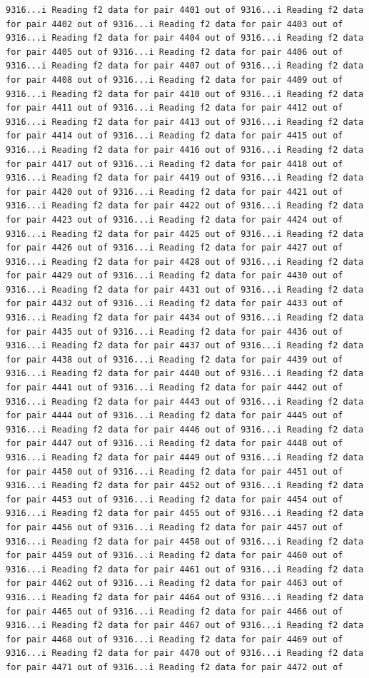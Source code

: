 \documentclass[
]{article}
\begin{document}
\begin{verbatim}
9316...i Reading f2 data for pair 4401 out of 9316...i Reading f2 data for pair 4402 out of 9316...i Reading f2 data for pair 4403 out of 9316...i Reading f2 data for pair 4404 out of 9316...i Reading f2 data for pair 4405 out of 9316...i Reading f2 data for pair 4406 out of 9316...i Reading f2 data for pair 4407 out of 9316...i Reading f2 data for pair 4408 out of 9316...i Reading f2 data for pair 4409 out of 9316...i Reading f2 data for pair 4410 out of 9316...i Reading f2 data for pair 4411 out of 9316...i Reading f2 data for pair 4412 out of 9316...i Reading f2 data for pair 4413 out of 9316...i Reading f2 data for pair 4414 out of 9316...i Reading f2 data for pair 4415 out of 9316...i Reading f2 data for pair 4416 out of 9316...i Reading f2 data for pair 4417 out of 9316...i Reading f2 data for pair 4418 out of 9316...i Reading f2 data for pair 4419 out of 9316...i Reading f2 data for pair 4420 out of 9316...i Reading f2 data for pair 4421 out of 9316...i Reading f2 data for pair 4422 out of 9316...i Reading f2 data for pair 4423 out of 9316...i Reading f2 data for pair 4424 out of 9316...i Reading f2 data for pair 4425 out of 9316...i Reading f2 data for pair 4426 out of 9316...i Reading f2 data for pair 4427 out of 9316...i Reading f2 data for pair 4428 out of 9316...i Reading f2 data for pair 4429 out of 9316...i Reading f2 data for pair 4430 out of 9316...i Reading f2 data for pair 4431 out of 9316...i Reading f2 data for pair 4432 out of 9316...i Reading f2 data for pair 4433 out of 9316...i Reading f2 data for pair 4434 out of 9316...i Reading f2 data for pair 4435 out of 9316...i Reading f2 data for pair 4436 out of 9316...i Reading f2 data for pair 4437 out of 9316...i Reading f2 data for pair 4438 out of 9316...i Reading f2 data for pair 4439 out of 9316...i Reading f2 data for pair 4440 out of 9316...i Reading f2 data for pair 4441 out of 9316...i Reading f2 data for pair 4442 out of 9316...i Reading f2 data for pair 4443 out of 9316...i Reading f2 data for pair 4444 out of 9316...i Reading f2 data for pair 4445 out of 9316...i Reading f2 data for pair 4446 out of 9316...i Reading f2 data for pair 4447 out of 9316...i Reading f2 data for pair 4448 out of 9316...i Reading f2 data for pair 4449 out of 9316...i Reading f2 data for pair 4450 out of 9316...i Reading f2 data for pair 4451 out of 9316...i Reading f2 data for pair 4452 out of 9316...i Reading f2 data for pair 4453 out of 9316...i Reading f2 data for pair 4454 out of 9316...i Reading f2 data for pair 4455 out of 9316...i Reading f2 data for pair 4456 out of 9316...i Reading f2 data for pair 4457 out of 9316...i Reading f2 data for pair 4458 out of 9316...i Reading f2 data for pair 4459 out of 9316...i Reading f2 data for pair 4460 out of 9316...i Reading f2 data for pair 4461 out of 9316...i Reading f2 data for pair 4462 out of 9316...i Reading f2 data for pair 4463 out of 9316...i Reading f2 data for pair 4464 out of 9316...i Reading f2 data for pair 4465 out of 9316...i Reading f2 data for pair 4466 out of 9316...i Reading f2 data for pair 4467 out of 9316...i Reading f2 data for pair 4468 out of 9316...i Reading f2 data for pair 4469 out of 9316...i Reading f2 data for pair 4470 out of 9316...i Reading f2 data for pair 4471 out of 9316...i Reading f2 data for pair 4472 out of 
\end{verbatim}
\end{document}
